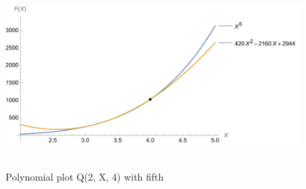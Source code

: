 ﻿\begin{figure}[H]
    \centering
    \includegraphics[width=1\textwidth]{sections/images/04_plots_polynomial_q2_n4_with_fifth}
    ~\caption{Polynomial plot Q(2, X, 4) with fifth}\label{fig:figure10}
\end{figure}
